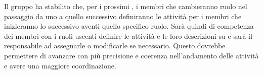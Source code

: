 Il gruppo ha stabilito che, per i prossimi , i membri che cambieranno ruolo nel passaggio da uno  a quello successivo definiranno le attività per i membri che inizieranno lo  successivo aventi quello specifico ruolo. Sarà quindi di competenza dei membri con i ruoli uscenti definire le attività e le loro descrizioni su  e sarà il responsabile ad assegnarle o modificarle se necessario. Questo dovrebbe permettere di avanzare con più precisione e coerenza nell'andamento delle attività e avere una maggiore coordinazione. 
